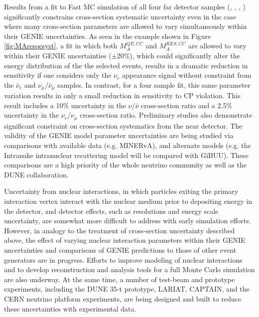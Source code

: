 Results from a fit to Fast MC simulation of all four far detector samples
(\nue, \anue, \numu, \anumu) significantly
constrains cross-section systematic uncertainty even in the case where many
cross-section parameters are allowed to vary simultaneously within their
GENIE uncertainties. As seen in the example shown in Figure
\ref{fig:MAresqesyst}, 
a fit in which both $M_A^{QE,CC}$ and 
$M_A^{RES,CC}$ are allowed to vary within their GENIE uncertainties 
($\pm$20\%), which could significantly alter the energy distribution of the 
the selected events, results in a dramatic reduction in sensitivity if one 
considers only the $\nu_e$ appearance signal without constraint from the 
$\bar{\nu}_e$ and $\nu_{\mu}$/$\bar{\nu}_{\mu}$ samples.
In contrast, for a four sample fit,
this same parameter variation results in only a small reduction in
sensitivity to CP violation.
This result includes a 10\% uncertainty in the $\nu/\bar{\nu}$
cross-section ratio and a 2.5\% uncertainty in the $\nu_e/\nu_{\mu}$
cross-section ratio.
Preliminary studies also
demonstrate significant constraint on cross-section systematics from the 
near detector. The validity of the GENIE model parameter uncertainties are being studied 
via comparisons with available data (e.g. MINERvA), and alternate models (e.g. the 
Intranuke intranuclear recattering model will be compared with GiBUU). These comparisons 
are a high priority of the whole neutrino community as well as the DUNE collaboration.

Uncertainty from nuclear interactions, in which particles exiting the primary
interaction vertex interact with the nuclear medium prior to depositing energy
in the detector, and detector effects, such as resolutions and energy scale
uncertainty, are somewhat more difficult to address with early simulation efforts.
However, in analogy to the treatment of cross-section uncertainty described above,
the effect of varying nuclear interaction parameters within their GENIE
uncertainties and comparisons of GENIE predictions to those of other
event generators are in progress.
Efforts to improve modeling of nuclear interactions and to develop 
reconstruction and analysis tools for a full Monte Carlo simulation are also underway. 
At the same time,
a number of test-beam and prototype experiments, including the DUNE 35-t prototype,
LARIAT, CAPTAIN, and the CERN neutrino platform experiments, are being designed and built to reduce these
uncertainties with experimental data.
